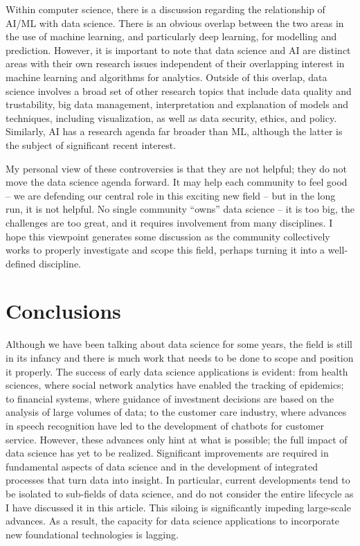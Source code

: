 \documentclass[11pt]{article}
\begin{document}
Within computer science, there is a discussion regarding the relationship of AI/ML with data science. There is an obvious overlap between the two areas in the use of machine learning, and particularly deep learning, for modelling and prediction. However, it is important to note that data science and AI are distinct areas with their own research issues independent of their overlapping interest in machine learning and algorithms for analytics. Outside of this overlap, data science involves a broad set of other research topics that include data quality and trustability, big data management, interpretation and explanation of models and techniques, including visualization, as well as data security, ethics, and policy. Similarly, AI has a research agenda far broader than ML, although the latter is the subject of significant recent interest.

My personal view of these controversies is that they are not helpful; they do not move the data science agenda forward. It may help each community to feel good -- we are defending our central role in this exciting new field -- but in the long run, it is not helpful. No single community ``owns'' data science -- it is too big, the challenges are too great, and it requires involvement from many disciplines. I hope this viewpoint generates some discussion as the community collectively works to properly investigate and scope this field, perhaps turning it into a well-defined discipline.

\section{Conclusions}

Although we have been talking about data science for some years, the field is still in its infancy and there is much work that needs to be done to scope and position it properly. The success of early data science applications is evident: from health sciences, where social network analytics have enabled the tracking of epidemics; to financial systems, where guidance of investment decisions are based on the analysis of large volumes of data; to the customer care industry, where advances in speech recognition have led to the development of chatbots for customer service. However, these advances only hint at what is possible; the full impact of data science has yet to be realized. Significant improvements are required in fundamental aspects of data science and in the development of integrated processes that turn data into insight. In particular, current developments tend to be isolated to sub-fields of data science, and do not consider the entire lifecycle as I have discussed it in this article. This siloing is significantly impeding large-scale advances. As a result, the capacity for data science applications to incorporate new foundational technologies is lagging.
\end{document}
